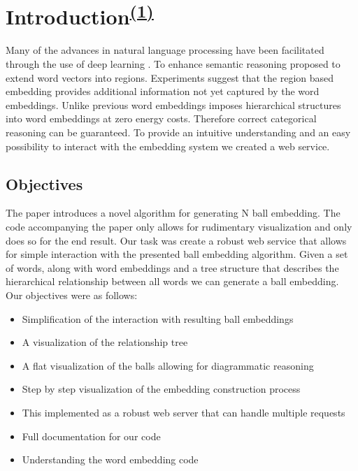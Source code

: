 \chapter[Introduction]{Introduction\textsuperscript{\hyperref[Jan]{(1)}}}

Many of the advances in natural language processing have been facilitated through the use of deep learning \cite{mikolov2013efficient,devlin2019bert,raffel2020exploring}. To enhance semantic reasoning \cite{Erk} proposed to extend word vectors into regions. Experiments suggest that the region based embedding provides additional information not yet captured by the word embeddings. Unlike previous word embeddings \cite{dong2018encoding} imposes hierarchical structures into word embeddings at zero energy costs. Therefore correct categorical reasoning can be guaranteed. To provide an intuitive understanding and an easy possibility to interact with the embedding system we created a web service. 

\section{Objectives}
\label{objectives}
The paper \cite{dong2018encoding} introduces a novel algorithm for generating N ball embedding. The code accompanying the paper only allows for rudimentary visualization and only does so for the end result. Our task was create a robust web service that allows for simple interaction with the presented ball embedding algorithm. 
Given a set of words, along with word embeddings and a tree structure that describes the hierarchical relationship between all words we can generate a ball embedding. \\

Our objectives were as follows:
\begin{itemize}
	\item Simplification of the interaction with resulting ball embeddings
	\item A visualization of the relationship tree
	\item A flat visualization of the balls allowing for diagrammatic reasoning
	\item Step by step visualization of the embedding construction process
	\item This implemented as a robust web server that can handle multiple requests
	\item Full documentation for our code
	\item Understanding the word embedding code
\end{itemize}


